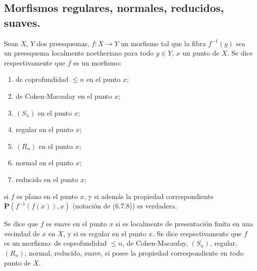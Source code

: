 \subsection{Morfismos regulares, normales, reducidos, suaves.}
\label{subsection:IV.6.8}

\begin{definition}[6.8.1]
\label{IV.2.s6.8.1-fr}
Sean $X$, $Y$ dos preesquemas, $f:X\to Y$ un morfismo tal que la fibra
$f^{-1}(y)$ sea un preesquema localmente noetheriano para todo $y\in Y$, $x$
un punto de $X$. Se dice respectivamente que $f$ es un morfismo:
\begin{enumerate}
\item[\textup{(i)}] de coprofundidad $\leq n$ en el punto $x$;
\item[\textup{(ii)}] de Cohen-Macaulay en el punto $x$;
\item[\textup{(iii)}] $(S_n)$ en el punto $x$;
\item[\textup{(iv)}] regular en el punto $x$;
\item[\textup{(v)}] $(R_n)$ en el punto $x$;
\item[\textup{(vi)}] normal en el punto $x$;
\item[\textup{(vii)}] reducido en el punto $x$;
\end{enumerate}
si $f$ es plano en el punto $x$, y si además la propiedad correspondiente
$\boldsymbol{P}(f^{-1}(f(x)),x)$ (notación de \textup{(6.7.8)}) es verdadera.

Se dice que $f$ es suave en el punto $x$ si es localmente de presentación finita
en una vecindad de $x$ en $X$, y si es regular en el punto $x$. Se dice
respectivamente que $f$ es un morfismo: de coprofundidad $\leq n$, de
Cohen-Macaulay, $(S_n)$, regular, $(R_n)$, normal, reducido, suave, si posee la
propiedad correspondiente en todo punto de $X$.
\end{definition}
